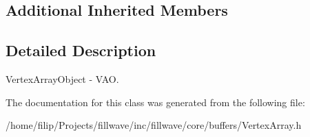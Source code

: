 \subsection*{Additional Inherited Members}


\subsection{Detailed Description}
Vertex\+Array\+Object -\/ V\+AO. 

The documentation for this class was generated from the following file\+:\begin{DoxyCompactItemize}
\item 
/home/filip/\+Projects/fillwave/inc/fillwave/core/buffers/Vertex\+Array.\+h\end{DoxyCompactItemize}

